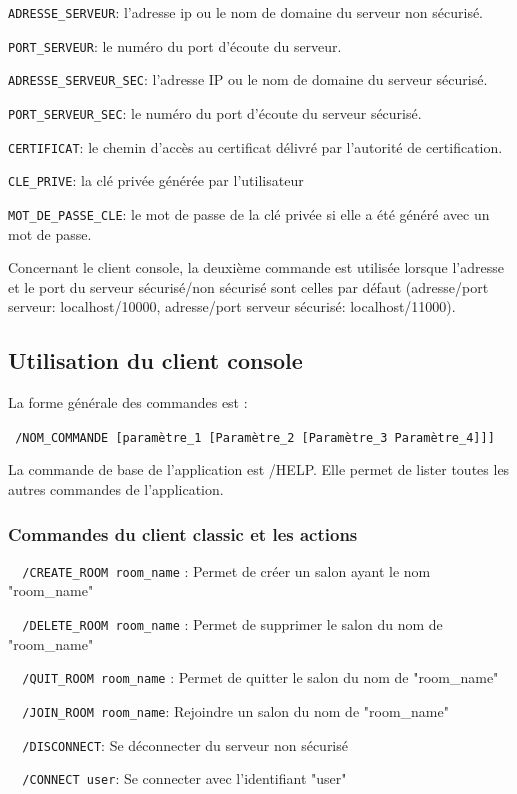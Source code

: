 \documentclass[a4paper,11pt,french]{book}
\begin{document}
\verb+ADRESSE_SERVEUR+: l'adresse ip ou le nom de domaine du serveur non sécurisé.

\verb+PORT_SERVEUR+: le numéro du port d'écoute du serveur.

\verb+ADRESSE_SERVEUR_SEC+: l'adresse IP ou le nom de domaine du serveur sécurisé.

\verb+PORT_SERVEUR_SEC+: le numéro du port d'écoute du serveur sécurisé.

\verb+CERTIFICAT+: le chemin d'accès au certificat délivré par l'autorité de certification.

\verb+CLE_PRIVE+: la clé privée générée par l'utilisateur

\verb+MOT_DE_PASSE_CLE+: le mot de passe de la clé privée si elle a été généré avec un mot de passe.

	Concernant le client console, la deuxième commande est utilisée lorsque l'adresse et le port du serveur sécurisé/non sécurisé sont celles par défaut (adresse/port serveur: localhost/10000, adresse/port serveur sécurisé: localhost/11000).
	
\subsection{Utilisation du client console}
	
	La forme générale des commandes est : 
	
\verb+ /NOM_COMMANDE [paramètre_1 [Paramètre_2 [Paramètre_3 Paramètre_4]]]+

La commande de base de l'application est /HELP. Elle permet de lister toutes les autres commandes de l'application.
\subsubsection{Commandes du client classic et les actions}

\verb+	/CREATE_ROOM room_name+  : Permet de créer un salon ayant le nom "room\_name"

\verb+	/DELETE_ROOM room_name+ :  Permet de supprimer le salon du nom de "room\_name"

\verb+	/QUIT_ROOM room_name+ :  Permet de quitter le salon du nom de "room\_name"

\verb+	/JOIN_ROOM room_name+:  Rejoindre un salon du nom de "room\_name"

\verb+	/DISCONNECT+: Se déconnecter du serveur non sécurisé

\verb+	/CONNECT user+:  Se connecter avec l'identifiant "user"
\end{document}
